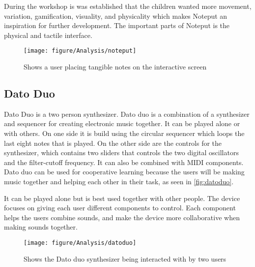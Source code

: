 During the workshop is was established that the children wanted more movement, variation, gamification, visuality, and physicality which makes Noteput an inspiration for further development. The important parts of Noteput is the physical and tactile interface.

\begin{figure}[H]
	\centering
	\texttt{[image: figure/Analysis/noteput]}
	\caption{Shows a user placing tangible notes on the interactive screen}
	\label{fig:noteput}
\end{figure}

\subsection{Dato Duo} 
Dato Duo is a two person synthesizer. Dato duo is a combination of a synthesizer and sequencer for creating electronic music together. It can be played alone or with others. On one side it is build using the circular sequencer which loops the last eight notes that is played. On the other side are the controls for the synthesizer, which contains two sliders that controls the two digital oscillators and the filter-cutoff frequency. It can also be combined with MIDI components. Dato duo can be used for cooperative learning because the users will be making music together and helping each other in their task, as seen in \autoref{fig:datoduo}.

It can be played alone but is best used together with other people. The device focuses on giving each user different components to control. Each component helps the users combine sounds, and make the device more collaborative when making sounds together.
\begin{figure}[H]
	\centering
	\texttt{[image: figure/Analysis/datoduo]}
	\caption{Shows the Dato duo synthesizer being interacted with by two users}
	\label{fig:datoduo}
\end{figure}

